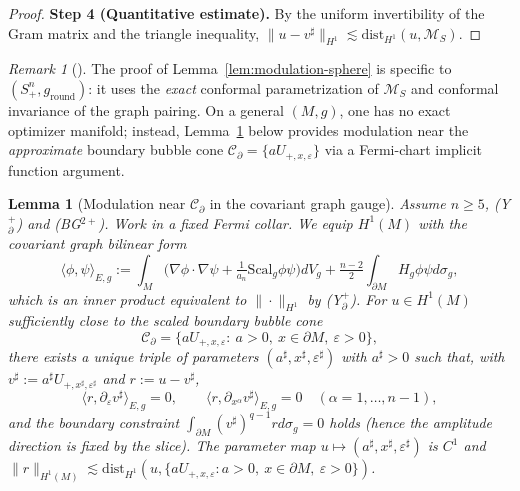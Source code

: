 \documentclass[11pt,reqno,a4paper]{amsart}
\numberwithin{equation}{section}
\theoremstyle{plain}
\newtheorem{lemma}[theorem]{Lemma}
\newcommand{\Scal}{\mathrm{Scal}}
\theoremstyle{remark}
\newtheorem{remark}[theorem]{Remark}
\theoremstyle{plain}
\begin{document}
\begin{proof}
\smallskip
\noindent\textbf{Step 4 (Quantitative estimate).}
By the uniform invertibility of the Gram matrix and the
triangle inequality,
$\|u-v^\sharp\|_{H^1}\lesssim\mathrm{dist}_{H^1}(u,\mathcal M_S)$.
\end{proof}

\begin{remark}[]\label{rem:modulation-scope}
The proof of Lemma~\ref{lem:modulation-sphere} is specific to
$(S^n_+,g_{\mathrm{round}})$:
it uses the \emph{exact} conformal parametrization of
$\mathcal M_S$ and conformal invariance of the graph pairing.
On a general $(M,g)$, one has no exact optimizer manifold;
instead, Lemma~\ref{lem:modulation} below provides modulation
near the \emph{approximate} boundary bubble cone
$\mathcal C_\partial=\{aU_{+,x,\varepsilon}\}$
via a Fermi-chart implicit function argument.
\end{remark}

\begin{lemma}[Modulation near $\mathcal C_\partial$ in the covariant graph gauge]\label{lem:modulation}
Assume $n\ge5$, \textup{(Y$^+_{\partial}$)} and \textup{(BG$^{2+}$)}. Work in a fixed Fermi collar. We equip $H^1(M)$ with the covariant graph bilinear form
\[
\langle \phi,\psi\rangle_{E,g}
:= \int_M\Big(\nabla\phi\cdot\nabla\psi+\tfrac{1}{a_n}\Scal_g\phi\psi\Big)dV_g
   + \tfrac{n-2}{2}\int_{\partial M} H_g\phi\psi d\sigma_g,
\]
which is an inner product equivalent to $\|\cdot\|_{H^1}$ by \textup{(Y$^+_{\partial}$)}. For $u\in H^1(M)$ sufficiently close to the scaled boundary bubble cone
\[
\mathcal C_\partial=\big\{aU_{+,x,\varepsilon}:\ a>0,\ x\in\partial M,\ \varepsilon>0\big\},
\]
there exists a unique triple of parameters $(a^\sharp,x^\sharp,\varepsilon^\sharp)$ with $a^\sharp>0$ such that, with $v^\sharp:=a^\sharp U_{+,x^\sharp,\varepsilon^\sharp}$ and $r:=u-v^\sharp$,
\[
\langle r,\partial_{\varepsilon}v^\sharp\rangle_{E,g}=0,
\qquad
\langle r,\partial_{x^\alpha}v^\sharp\rangle_{E,g}=0\quad(\alpha=1,\dots,n-1),
\]
and the boundary constraint $\int_{\partial M}(v^\sharp)^{q-1}rd\sigma_g=0$ holds (hence the amplitude direction is fixed by the slice). The parameter map $u\mapsto(a^\sharp,x^\sharp,\varepsilon^\sharp)$ is $C^1$ and
$\|r\|_{H^1(M)}\lesssim \mathrm{dist}_{H^1}(u,\{aU_{+,x,\varepsilon}:a>0,\ x\in\partial M,\ \varepsilon>0\})$.
\end{lemma}
\end{document}
